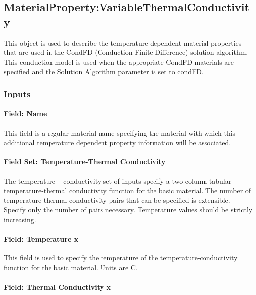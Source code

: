 \subsection{MaterialProperty:VariableThermalConductivity}\label{materialpropertyvariablethermalconductivity}

This object is used to describe the temperature dependent material properties that are used in the CondFD (Conduction Finite Difference) solution algorithm. This conduction model is used when the appropriate CondFD materials are specified and the Solution Algorithm parameter is set to condFD.

\subsubsection{Inputs}\label{inputs-6-027}

\paragraph{Field: Name}\label{field-name-6-022}

This field is a regular material name specifying the material with which this additional temperature dependent property information will be associated.

\paragraph{Field Set: Temperature-Thermal Conductivity}\label{field-set-temperature-thermal-conductivity}

The temperature -- conductivity set of inputs specify a two column tabular temperature-thermal conductivity function for the basic material. The number of temperature-thermal conductivity pairs that can be specified is extensible. Specify only the number of pairs necessary. Temperature values should be strictly increasing.

\paragraph{Field: Temperature x}\label{field-temperature-x-1}

This field is used to specify the temperature of the temperature-conductivity function for the basic material. Units are C.

\paragraph{Field: Thermal Conductivity x}\label{field-thermal-conductivity-x}


